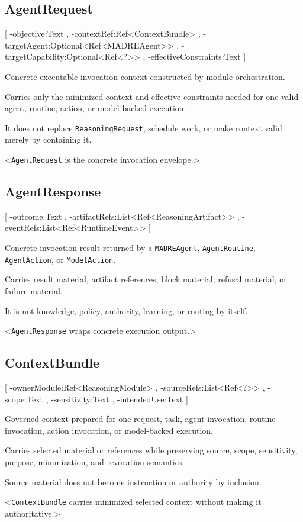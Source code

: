 \subsection{AgentRequest}
[
	\UMLAt-objective:Text ,
	\UMLAt-contextRef:Ref<ContextBundle> ,
	\UMLAt-targetAgent:Optional<Ref<MADREAgent>> ,
	\UMLAt-targetCapability:Optional<Ref<?>> ,
	\UMLAt-effectiveConstraints:Text
]{%
	\item[] Concrete executable invocation context constructed by module orchestration.
	\item[] Carries only the minimized context and effective constraints needed for one valid agent, routine, action, or model-backed execution.
	\item[] It does not replace \texttt{ReasoningRequest}, schedule work, or make context valid merely by containing it.
}<\texttt{AgentRequest} is the concrete invocation envelope.>

\subsection{AgentResponse}
[
	\UMLAt-outcome:Text ,
	\UMLAt-artifactRefs:List<Ref<ReasoningArtifact>> ,
	\UMLAt-eventRefs:List<Ref<RuntimeEvent>>
]{%
	\item[] Concrete invocation result returned by a \texttt{MADREAgent}, \texttt{AgentRoutine}, \texttt{AgentAction}, or \texttt{ModelAction}.
	\item[] Carries result material, artifact references, block material, refusal material, or failure material.
	\item[] It is not knowledge, policy, authority, learning, or routing by itself.
}<\texttt{AgentResponse} wraps concrete execution output.>

\subsection{ContextBundle}
[
	\UMLAt-ownerModule:Ref<ReasoningModule> ,
	\UMLAt-sourceRefs:List<Ref<?>> ,
	\UMLAt-scope:Text ,
	\UMLAt-sensitivity:Text ,
	\UMLAt-intendedUse:Text
]{%
	\item[] Governed context prepared for one request, task, agent invocation, routine invocation, action invocation, or model-backed execution.
	\item[] Carries selected material or references while preserving source, scope, sensitivity, purpose, minimization, and revocation semantics.
	\item[] Source material does not become instruction or authority by inclusion.
}<\texttt{ContextBundle} carries minimized selected context without making it authoritative.>

